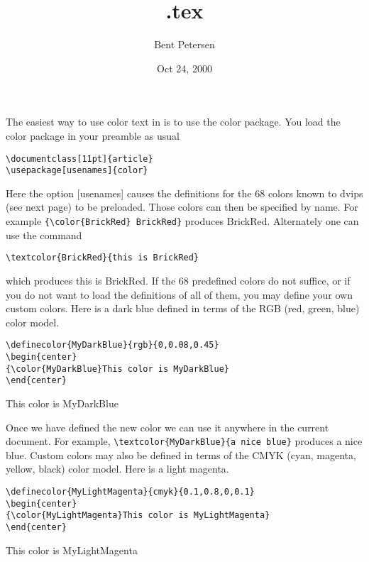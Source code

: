 \documentclass[11pt]{article}
\title{\color{Blue}\jobname.tex}
\author{Bent Petersen}
\date{Oct 24, 2000}
\begin{document}
\maketitle
\thispagestyle{empty}
The easiest way to use color text in \LaTeXe{} is to use the color
package. You load the color package in your preamble as usual
\begin{verbatim}
\documentclass[11pt]{article}
\usepackage[usenames]{color}
\end{verbatim}
Here the option [usenames] causes the definitions for the 68 colors
known to dvips (see next page) to be preloaded. Those colors can then
be specified by name. For example \verb={\color{BrickRed} BrickRed}=
produces {\color{BrickRed} BrickRed}. Alternately one can use the
command
\begin{verbatim}
\textcolor{BrickRed}{this is BrickRed}
\end{verbatim}
which produces \textcolor{BrickRed}{this is BrickRed}.
If the 68 predefined colors do not suffice, or if you do not want
to load the definitions of all of them, you may define your own
custom colors.
Here is a dark blue defined in terms of the RGB (red, green, blue) color model.
\begin{verbatim}
\definecolor{MyDarkBlue}{rgb}{0,0.08,0.45}
\begin{center}
{\color{MyDarkBlue}This color is MyDarkBlue}
\end{center}
\end{verbatim}
\begin{center}
{\color{MyDarkBlue}This color is MyDarkBlue}
\end{center}
Once we have defined the new color we can use it anywhere in
the current document. For example,
\verb=\textcolor{MyDarkBlue}{a nice blue}= produces
\textcolor{MyDarkBlue}{a nice blue}.
Custom colors may also be defined in terms of the CMYK
(cyan, magenta, yellow, black)
color model. Here is a light magenta.
\begin{verbatim}
\definecolor{MyLightMagenta}{cmyk}{0.1,0.8,0,0.1}
\begin{center}
{\color{MyLightMagenta}This color is MyLightMagenta}
\end{center}
\end{verbatim}
\begin{center}
{\color{MyLightMagenta}This color is MyLightMagenta}
\end{center}
\end{document}
